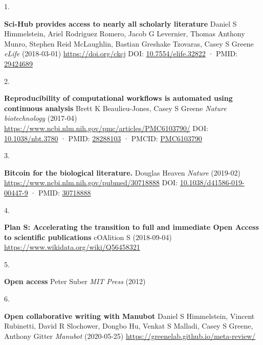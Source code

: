 \documentclass[
]{article}
\newlength{\cslhangindent}
\newlength{\csllabelwidth}
\newlength{\cslentryspacingunit} %
\newenvironment{CSLReferences}[2] %
 {%
  \setlength{\parindent}{0pt}
  \ifodd #1
  \let\oldpar\par
  \def\par{\hangindent=\cslhangindent\oldpar}
  \fi
  \setlength{\parskip}{#2\cslentryspacingunit}
 }%
 {}
\newcommand{\CSLBlock}[1]{#1\hfill\break}
\newcommand{\CSLLeftMargin}[1]{\parbox[t]{\csllabelwidth}{#1}}
\newcommand{\CSLRightInline}[1]{\parbox[t]{\linewidth - \csllabelwidth}{#1}\break}
\begin{document}
\hypertarget{refs}{}
\begin{CSLReferences}{0}{0}
\leavevmode{}%
\CSLLeftMargin{1. }%
\CSLRightInline{\textbf{Sci-Hub provides access to nearly all scholarly literature}
\CSLBlock{Daniel S Himmelstein, Ariel Rodriguez Romero, Jacob G Levernier, Thomas Anthony Munro, Stephen Reid McLaughlin, Bastian Greshake Tzovaras, Casey S Greene} \emph{eLife} (2018-03-01) \url{https://doi.org/ckcj}
\CSLBlock{DOI: \href{https://doi.org/10.7554/elife.32822}{10.7554/elife.32822} · PMID: \href{https://www.ncbi.nlm.nih.gov/pubmed/29424689}{29424689}}}

\leavevmode{}%
\CSLLeftMargin{2. }%
\CSLRightInline{\textbf{Reproducibility of computational workflows is automated using continuous analysis}
\CSLBlock{Brett K Beaulieu-Jones, Casey S Greene} \emph{Nature biotechnology} (2017-04) \url{https://www.ncbi.nlm.nih.gov/pmc/articles/PMC6103790/}
\CSLBlock{DOI: \href{https://doi.org/10.1038/nbt.3780}{10.1038/nbt.3780} · PMID: \href{https://www.ncbi.nlm.nih.gov/pubmed/28288103}{28288103} · PMCID: \href{https://www.ncbi.nlm.nih.gov/pmc/articles/PMC6103790}{PMC6103790}}}

\leavevmode{}%
\CSLLeftMargin{3. }%
\CSLRightInline{\textbf{Bitcoin for the biological literature.}
\CSLBlock{Douglas Heaven} \emph{Nature} (2019-02) \url{https://www.ncbi.nlm.nih.gov/pubmed/30718888}
\CSLBlock{DOI: \href{https://doi.org/10.1038/d41586-019-00447-9}{10.1038/d41586-019-00447-9} · PMID: \href{https://www.ncbi.nlm.nih.gov/pubmed/30718888}{30718888}}}

\leavevmode{}%
\CSLLeftMargin{4. }%
\CSLRightInline{\textbf{Plan S: Accelerating the transition to full and immediate Open Access to scientific publications}
\CSLBlock{cOAlition S} (2018-09-04) \url{https://www.wikidata.org/wiki/Q56458321}}

\leavevmode{}%
\CSLLeftMargin{5. }%
\CSLRightInline{\textbf{Open access}
\CSLBlock{Peter Suber} \emph{MIT Press} (2012)}

\leavevmode{}%
\CSLLeftMargin{6. }%
\CSLRightInline{\textbf{Open collaborative writing with Manubot}
\CSLBlock{Daniel S Himmelstein, Vincent Rubinetti, David R Slochower, Dongbo Hu, Venkat S Malladi, Casey S Greene, Anthony Gitter} \emph{Manubot} (2020-05-25) \url{https://greenelab.github.io/meta-review/}}


\end{CSLReferences}
\end{document}

